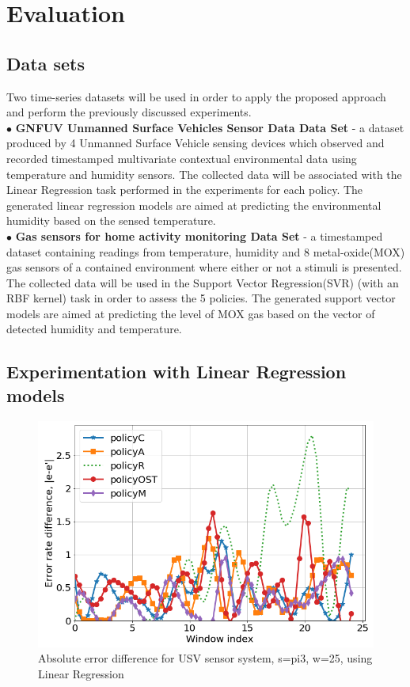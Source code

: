 \documentclass{mpaper}
\begin{document}
\section{Evaluation}

\subsection*{Data sets}
Two time-series datasets will be used in order to apply the proposed approach and perform the previously discussed experiments.
\\$\bullet$ \textbf{GNFUV Unmanned Surface Vehicles Sensor Data Data Set} \cite{harth2018} - a dataset produced by 4 Unmanned Surface Vehicle sensing devices which observed and recorded timestamped multivariate contextual environmental data using temperature and humidity sensors. The collected data will be associated with the Linear Regression task performed in the experiments for each policy. The generated linear regression models are aimed at predicting the environmental humidity based on the sensed temperature.
\\$\bullet$ \textbf{Gas sensors for home activity monitoring Data Set } \cite{HUERTA2016169} - a timestamped dataset containing readings from temperature, humidity and 8 metal-oxide(MOX) gas sensors of a contained environment where either or not a stimuli is presented. The collected data will be used in the Support Vector Regression(SVR) (with an RBF kernel) task in order to assess the 5 policies. The generated support vector models are aimed at predicting the level of MOX gas based on the vector of detected humidity and temperature.
\subsection{Experimentation with Linear Regression models}

\begin{figure}[h]
    \centering
    \includegraphics[scale=0.33]{imgs/lin_reg_pi3_w25.png}
    \caption{Absolute error difference for USV sensor system, s=pi3, w=25, using Linear Regression}
    \label{fig:err_lin_reg_pi3}
\end{figure}
\end{document}
